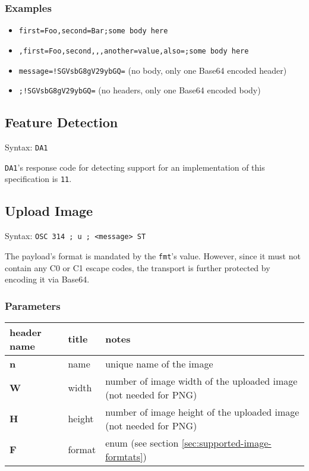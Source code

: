 \documentclass[a4paper]{article}
\newcommand{\code}[1]{\colorbox{light-gray}{\texttt{#1}}}
\newcommand{\DA}{\code{DA1}}
\begin{document}
\subsubsection*{Examples}

\begin{itemize}
    \item \code{first=Foo,second=Bar;some body here}
    \item \code{,first=Foo,second,,,another=value,also=;some body here}
    \item \code{message=!SGVsbG8gV29ybGQ=} (no body, only one Base64 encoded header)
    \item \code{;!SGVsbG8gV29ybGQ=} (no headers, only one Base64 encoded body)
\end{itemize}

\subsection{Feature Detection} %

Syntax: \DA

\DA's response code for detecting support for an implementation of this specification is \code{11}.

\subsection{Upload Image} %

Syntax: \code{OSC 314 ; u ; <message> ST}

The payload's format is mandated by the \code{fmt}'s value. However, since it must not contain
any C0 or C1 escape codes, the transport is further protected by encoding it via Base64.

\subsubsection*{Parameters}

\begin{tabular}{ |l|l|l| }
    \hline
    \textbf{header name}   & \textbf{title}   & \textbf{notes} \\
    \hline
    \textbf{n}             & name             & unique name of the image \\
    \textbf{W}             & width            & number of image width of the uploaded image (not needed for PNG) \\
    \textbf{H}             & height           & number of image height of the uploaded image (not needed for PNG) \\
    \textbf{F}             & format           & enum (see section \ref{sec:supported-image-formtats}) \\
    \hline
\end{tabular}
\end{document}
